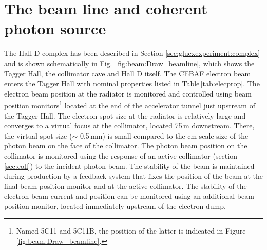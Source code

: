 \section[The beam line and coherent photon source]{The beam line and coherent photon source \label{sec:beamline}}

The Hall D complex has been described in Section \ref{sec:gluexexperiment:complex} and is shown schematically in Fig.~\ref{fig:beam:Draw_beamline}, which shows the Tagger Hall, the collimator cave and Hall D itself.
The CEBAF electron beam enters the Tagger Hall with nominal properties listed in Table\,\ref{tab:elecprop}.
The electron beam position at the radiator is monitored and controlled using beam position monitors\footnote{Named 5C11 and 5C11B, the position of the latter is indicated in Figure \ref{fig:beam:Draw_beamline}.} located at the end of the accelerator tunnel just upstream of the Tagger Hall.
The electron spot size at the radiator is relatively large and converges to a virtual focus at the collimator, located 75\,m downstream. There, the virtual spot size ($\sim$ 0.5\,mm) is small compared to the cm-scale size of the photon beam on the face of the collimator. The photon beam position on the collimator is monitored using the response of an active collimator (section \ref{sec:coll}) to the incident photon beam. The stability of the beam is maintained during production by a feedback system that fixes the position of the beam at the final beam position monitor and at the active collimator. The stability of the electron beam current and position can be monitored using an additional beam position monitor, located immediately upstream of the electron dump.

